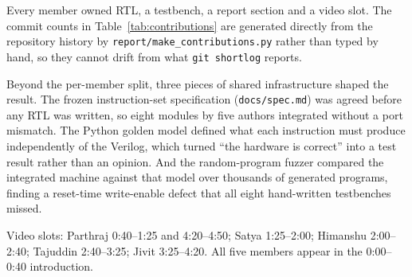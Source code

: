 
Every member owned RTL, a testbench, a report section and a video slot. The
commit counts in Table~\ref{tab:contributions} are generated directly from the
repository history by \texttt{report/make\_contributions.py} rather than typed
by hand, so they cannot drift from what \texttt{git shortlog} reports.



Beyond the per-member split, three pieces of shared infrastructure shaped the
result. The frozen instruction-set specification
(\texttt{docs/spec.md}) was agreed before any RTL was written, so eight modules
by five authors integrated without a port mismatch. The Python golden model
defined what each instruction must produce independently of the Verilog, which
turned ``the hardware is correct'' into a test result rather than an opinion.
And the random-program fuzzer compared the integrated machine against that model
over thousands of generated programs, finding a reset-time write-enable defect
that all eight hand-written testbenches missed.

Video slots: Parthraj 0:40--1:25 and 4:20--4:50; Satya 1:25--2:00;
Himanshu 2:00--2:40; Tajuddin 2:40--3:25; Jivit 3:25--4:20. All five members
appear in the 0:00--0:40 introduction.
